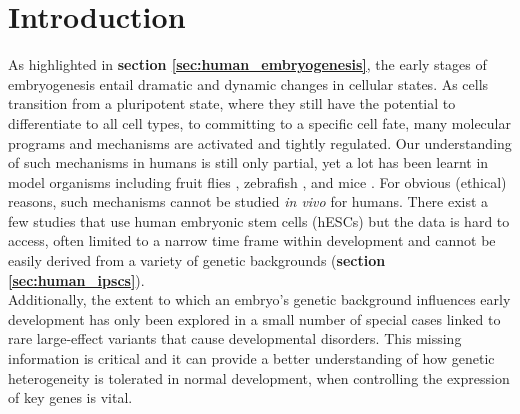 \newpage

\section{Introduction}
\label{sec:endodiff_intro}

As highlighted in \textbf{section \ref{sec:human_embryogenesis}}, the early stages of embryogenesis entail dramatic and dynamic changes in cellular states. 
As cells transition from a pluripotent state, where they still have the potential to differentiate to all cell types, to committing to a specific cell fate, many molecular programs and mechanisms are activated and tightly regulated.
Our understanding of such mechanisms in humans is still only partial, yet a lot has been learnt in model organisms including fruit flies \cite{rivera1996gradients, tomancak2002systematic, cusanovich2018cis}, zebrafish \cite{grunwald2002headwaters, ober2003endoderm, traver2003transplantation}, and mice \cite{corson2003spatial, tam2007gene, pijuan2019single}.
For obvious (ethical) reasons, such mechanisms cannot be studied \textit{in vivo} for humans. 
There exist a few studies that use human embryonic stem cells (hESCs) but the data is hard to access, often limited to a narrow time frame within development and cannot be easily derived from a variety of genetic backgrounds (\textbf{section \ref{sec:human_ipscs}}). \\

Additionally, the extent to which an embryo’s genetic background influences early development has only been explored in a small number of special cases linked to rare large-effect variants that cause developmental disorders. 
This missing information is critical and it can provide a better understanding of how genetic heterogeneity is tolerated in normal development, when controlling the expression of key genes is vital.\\

